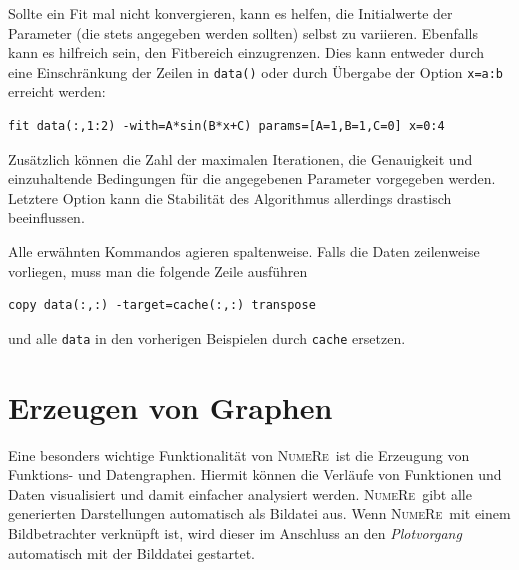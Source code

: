 \documentclass[DIV=14,headsepline,footsepline]{scrbook}
\newcommand{\NR}{\textsc{Nu\-me\-Re}}
\begin{document}
				Sollte ein Fit mal nicht konvergieren, kann es helfen, die Initialwerte der Parameter (die stets angegeben werden sollten) selbst zu variieren. Ebenfalls kann es hilfreich sein, den Fitbereich einzugrenzen. Dies kann entweder durch eine Einschränkung der Zeilen in \lstinline+data()+ oder durch Übergabe der Option \lstinline+x=a:b+ erreicht werden:
				\begin{lstlisting}
fit data(:,1:2) -with=A*sin(B*x+C) params=[A=1,B=1,C=0] x=0:4
				\end{lstlisting}
				Zusätzlich können die Zahl der maximalen Iterationen, die Genauigkeit und einzuhaltende Bedingungen für die angegebenen Parameter vorgegeben werden. Letztere Option kann die Stabilität des Algorithmus allerdings drastisch beeinflussen.
				
				Alle erwähnten Kommandos agieren spaltenweise. Falls die Daten zeilenweise vorliegen, muss man die folgende Zeile ausführen
				\begin{lstlisting}
copy data(:,:) -target=cache(:,:) transpose
				\end{lstlisting}
				und alle \lstinline+data+ in den vorherigen Beispielen durch \lstinline+cache+ ersetzen.
		\chapter{Erzeugen von Graphen}
			Eine besonders wichtige Funktionalität von \NR\ ist die Erzeugung von Funktions- und Datengraphen. Hiermit können die Verläufe von Funktionen und Daten visualisiert und damit einfacher analysiert werden. \NR\ gibt alle generierten Darstellungen automatisch als Bildatei aus. Wenn \NR\ mit einem Bildbetrachter verknüpft ist, wird dieser im Anschluss an den \emph{Plotvorgang} automatisch mit der Bilddatei gestartet.
\end{document}
